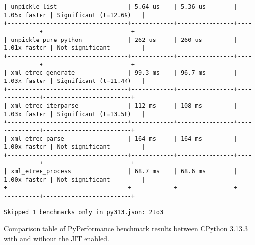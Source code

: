 \begin{code}
\begin{verbatim}
| unpickle_list                    | 5.64 us    | 5.36 us        | 1.05x faster | Significant (t=12.69)   |
+----------------------------------+------------+----------------+--------------+-------------------------+
| unpickle_pure_python             | 262 us     | 260 us         | 1.01x faster | Not significant         |
+----------------------------------+------------+----------------+--------------+-------------------------+
| xml_etree_generate               | 99.3 ms    | 96.7 ms        | 1.03x faster | Significant (t=11.44)   |
+----------------------------------+------------+----------------+--------------+-------------------------+
| xml_etree_iterparse              | 112 ms     | 108 ms         | 1.03x faster | Significant (t=13.58)   |
+----------------------------------+------------+----------------+--------------+-------------------------+
| xml_etree_parse                  | 164 ms     | 164 ms         | 1.00x faster | Not significant         |
+----------------------------------+------------+----------------+--------------+-------------------------+
| xml_etree_process                | 68.7 ms    | 68.6 ms        | 1.00x faster | Not significant         |
+----------------------------------+------------+----------------+--------------+-------------------------+

Skipped 1 benchmarks only in py313.json: 2to3
    \end{verbatim}
    \caption{Comparison table of PyPerformance benchmark results between CPython 3.13.3 with and without the JIT enabled.}
    \label{listing:pyperformance-results-313-313-jit}
\end{code}
